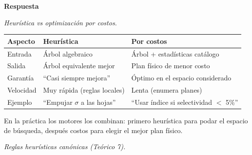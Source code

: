 \documentclass[11pt,a4paper]{article}
\newcommand{\itemcabecera}[1]{\noindent\textbf{#1}\par\medskip}
\newcommand{\bloqueRespuesta}{\itemcabecera{Respuesta}}
\begin{document}
\bloqueRespuesta

\textit{Heurística vs optimización por costos.}

\begin{center}
\begin{tabular}{lll}
\toprule
Aspecto & Heurística & Por costos \\
\midrule
Entrada      & Árbol algebraico         & Árbol + estadísticas catálogo \\
Salida       & Árbol equivalente mejor  & Plan físico de menor costo \\
Garantía     & ``Casi siempre mejora''  & Óptimo en el espacio considerado \\
Velocidad    & Muy rápida (reglas locales) & Lenta (enumera planes) \\
Ejemplo      & ``Empujar $\sigma$ a las hojas'' & ``Usar índice si selectividad $<$ 5\%'' \\
\bottomrule
\end{tabular}
\end{center}

En la práctica los motores los combinan: primero heurística para podar el espacio de búsqueda, después costos para elegir el mejor plan físico.

\textit{Reglas heurísticas canónicas (Teórico 7).}
\end{document}
